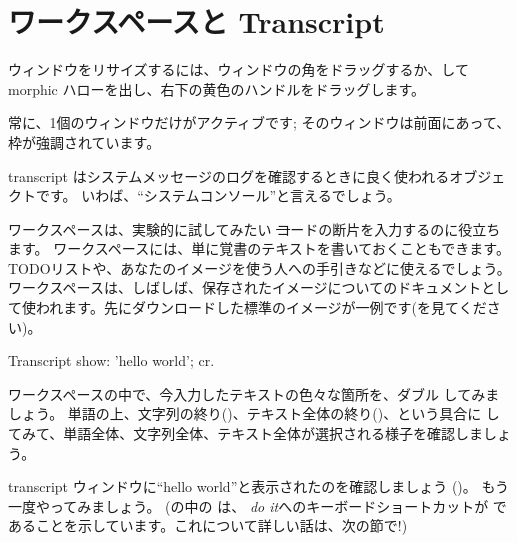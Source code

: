 \documentclass[a4paper,10pt,twoside]{book}
\begin{document}
\section{ワークスペースと Transcript}


ウィンドウをリサイズするには、ウィンドウの角をドラッグするか、\metaclick して morphic ハローを出し、右下の黄色のハンドルをドラッグします。

常に、1個のウィンドウだけがアクティブです; そのウィンドウは前面にあって、枠が強調されています。

transcript はシステムメッセージのログを確認するときに良く使われるオブジェクトです。
いわば、``システムコンソール''と言えるでしょう。

ワークスペースは、実験的に試してみたい \st コードの断片を入力するのに役立ちます。
ワークスペースには、単に覚書のテキストを書いておくこともできます。TODOリストや、あなたのイメージを使う人への手引きなどに使えるでしょう。
ワークスペースは、しばしば、保存されたイメージについてのドキュメントとして使われます。先にダウンロードした標準のイメージが一例です(を見てください)。

\begin{code}{}
Transcript show: 'hello world'; cr.
\end{code}

ワークスペースの中で、今入力したテキストの色々な箇所を、ダブル \click してみましょう。
単語の上、文字列の終り()、テキスト全体の終り()、という具合に \click してみて、単語全体、文字列全体、テキスト全体が選択される様子を確認しましょう。

transcript ウィンドウに``hello world''と表示されたのを確認しましょう
()。
もう一度やってみましょう。
(の中の は、 \emph{do it}へのキーボードショートカットが であることを示しています。これについて詳しい話は、次の節で!)
\end{document}
